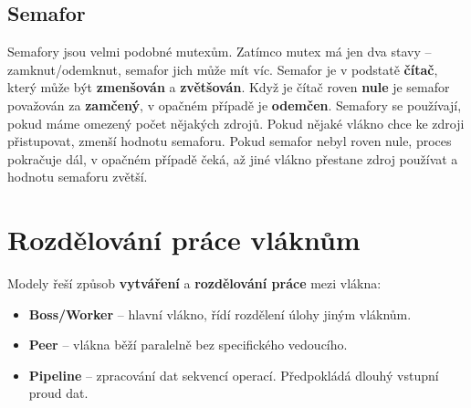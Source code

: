 \subsection{Semafor}
Semafory jsou velmi podobné mutexům. Zatímco mutex má jen dva stavy – zamknut/odemknut, semafor jich může mít víc. Semafor je v podstatě \textbf{čítač}, který může být \textbf{zmenšován} a \textbf{zvětšován}. Když je čítač roven \textbf{nule} je semafor považován za \textbf{zamčený}, v opačném případě je \textbf{odemčen}. Semafory se používají, pokud máme omezený počet nějakých zdrojů. Pokud nějaké vlákno chce ke zdroji přistupovat, zmenší hodnotu semaforu. Pokud semafor nebyl roven nule, proces pokračuje dál, v opačném případě čeká, až jiné vlákno přestane zdroj používat a hodnotu semaforu zvětší.

\section{Rozdělování práce vláknům}
Modely řeší způsob \textbf{vytváření} a \textbf{rozdělování práce} mezi vlákna:
\begin{itemize}
    \item \textbf{Boss/Worker} -- hlavní vlákno, řídí rozdělení úlohy jiným vláknům.
    \item \textbf{Peer} -- vlákna běží paralelně bez specifického vedoucího.
    \item \textbf{Pipeline} -- zpracování dat sekvencí operací. Předpokládá dlouhý vstupní proud dat.
\end{itemize}